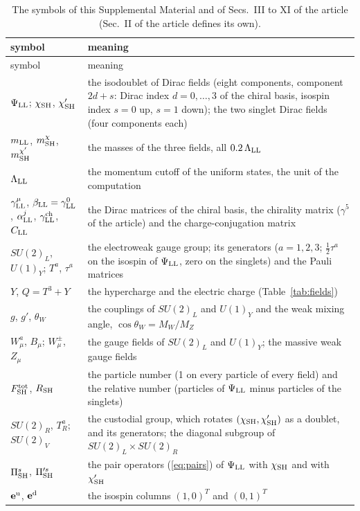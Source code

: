 \documentclass[aps,prd,onecolumn,superscriptaddress,nofootinbib,floatfix,longbibliography]{revtex4-2}
\newcommand{\LL}{{\rm LL}}
\newcommand{\SH}{{\rm SH}}
\begin{document}
\begingroup\small
\begin{longtable}{p{}p{}}
\caption{\label{tab:symbols}The symbols of this Supplemental Material and of Secs.~III to XI of the article (Sec.~II
of the article defines its own).}\\
\hline\hline
symbol & meaning\\ \hline
\endfirsthead
\hline symbol & meaning\\ \hline
\endhead
\hline\hline
\endlastfoot
$\Psi_\LL$; $\chi_\SH$, $\chi'_\SH$ & the isodoublet of Dirac fields (eight components, component $2d+s$: Dirac index $d=0,\dots,3$ of the chiral basis, isospin index $s=0$ up, $s=1$ down); the two singlet Dirac fields (four components each) \\
$m_\LL$, $m^\chi_\SH$, $m^{\chi'}_\SH$ & the masses of the three fields, all $0.2\,\Lambda_\LL$ \\
$\Lambda_\LL$ & the momentum cutoff of the uniform states, the unit of the computation \\
$\gamma^\mu_\LL$, $\beta_\LL=\gamma^0_\LL$, $\alpha^j_\LL$, $\gamma^{\rm ch}_\LL$, $C_\LL$ & the Dirac matrices of the chiral basis, the chirality matrix ($\gamma^5$ of the article) and the charge-conjugation matrix \\
$SU(2)_L$, $U(1)_Y$; $T^{a}$, $\tau^a$ & the electroweak gauge group; its generators ($a=1,2,3$; $\tfrac12\tau^a$ on the isospin of $\Psi_\LL$, zero on the singlets) and the Pauli matrices \\
$Y$, $Q=T^3+Y$ & the hypercharge and the electric charge (Table~\ref{tab:fields}) \\
$g$, $g'$, $\theta_W$ & the couplings of $SU(2)_L$ and $U(1)_Y$ and the weak mixing angle, $\cos\theta_W=M_W/M_Z$ \\
$W^a_\mu$, $B_\mu$; $W^\pm_\mu$, $Z_\mu$ & the gauge fields of $SU(2)_L$ and $U(1)_Y$; the massive weak gauge fields \\
$F^{\rm tot}_\SH$, $R_\SH$ & the particle number (1 on every particle of every field) and the relative number (particles of $\Psi_\LL$ minus particles of the singlets) \\
$SU(2)_R$, $T^a_R$; $SU(2)_V$ & the custodial group, which rotates $(\chi_\SH,\chi'_\SH)$ as a doublet, and its generators; the diagonal subgroup of $SU(2)_L\times SU(2)_R$ \\
$\Pi^s_\SH$, $\Pi'^s_\SH$ & the pair operators (\ref{eq:pairs}) of $\Psi_\LL$ with $\chi_\SH$ and with $\chi'_\SH$ \\
$\mathbf e^{\rm u}$, $\mathbf e^{\rm d}$ & the isospin columns $(1,0)^T$ and $(0,1)^T$ \\

\end{longtable}
\end{document}

